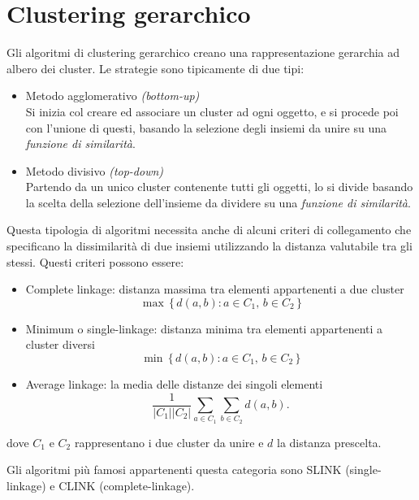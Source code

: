 \section{Clustering gerarchico}
	Gli algoritmi di clustering gerarchico creano una rappresentazione gerarchia ad albero dei cluster.
	Le strategie sono tipicamente di due tipi: 
	\begin{itemize}
		\item Metodo agglomerativo \emph{(bottom-up)} \\
		Si inizia col creare ed associare un cluster ad ogni oggetto, e si procede poi con l'unione di questi, basando la selezione degli insiemi da unire su una \emph{funzione di similarità}.

		\item Metodo divisivo \emph{(top-down)} \\
		Partendo da un unico cluster contenente tutti gli oggetti, lo si divide basando la scelta della selezione dell’insieme da dividere su una \emph{funzione di similarità}.
	\end{itemize}

	Questa tipologia di algoritmi necessita anche di alcuni criteri di collegamento che specificano la dissimilarità di due insiemi utilizzando la distanza valutabile tra gli stessi. Questi criteri possono essere: 
	\begin{itemize}
		\item Complete linkage: distanza massima tra elementi appartenenti a due cluster
			\begin{equation*}
				\max \, \{\, d(a,b) : a \in C_1,\, b \in C_2 \,\}
			\end{equation*}
		\item Minimum o single-linkage: distanza minima tra elementi appartenenti a cluster diversi
			\begin{equation*}
			 	\min \, \{\, d(a,b) : a \in C_1,\, b \in C_2 \,\}
			\end{equation*}

		\item Average linkage: la media delle distanze dei singoli elementi
			\begin{equation*}
				\frac{1}{|C_1| |C_2|} \sum_{a \in C_1 }\sum_{ b \in C_2} d(a,b). 
			\end{equation*}
	\end{itemize}
	dove $C_1$ e $C_2$ rappresentano i due cluster da unire e $d$ la distanza prescelta.

	Gli algoritmi più famosi appartenenti questa categoria sono SLINK (single-linkage) e CLINK (complete-linkage)\cite{clustering_gerarchico}.

